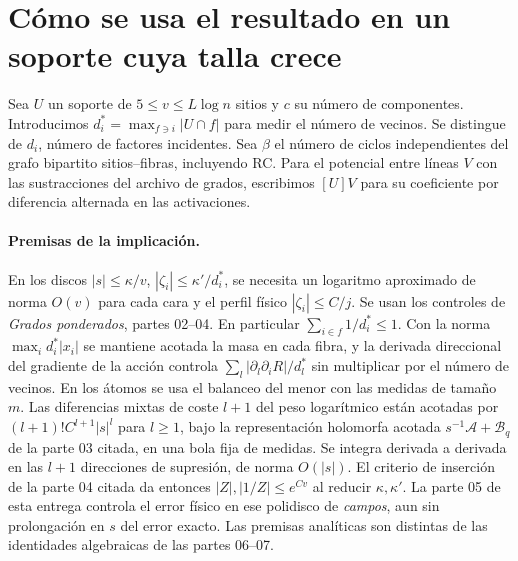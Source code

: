 \section{Cómo se usa el resultado en un soporte cuya talla crece}
Sea $U$ un soporte de $5\le v\le L\log n$ sitios y $c$ su número de componentes.
Introducimos $d_i^*=\max_{f\ni i}|U\cap f|$ para medir el número de vecinos.
Se distingue de $d_i$, número de factores incidentes. Sea $\beta$ el número de
ciclos independientes del grafo bipartito sitios--fibras, incluyendo RC.
Para el potencial entre líneas $V$ con las sustracciones del archivo de grados,
escribimos $[U]V$ para su coeficiente por diferencia alternada en las activaciones.
\paragraph{Premisas de la implicación.}
En los discos $|s|\le\kappa/v$, $|\zeta_i|\le\kappa'/d_i^*$, se necesita un logaritmo
aproximado de norma $O(v)$ para cada cara y el perfil físico $|\zeta_i|\le C/j$.
Se usan los controles de \emph{Grados ponderados}, partes 02--04. En particular
$\sum_{i\in f}1/d_i^*\le1$. Con la norma $\max_i d_i^*|x_i|$ se mantiene acotada
la masa en cada fibra, y la derivada direccional del gradiente de la acción controla
$\sum_l|\partial_l\partial_i R|/d_l^*$ sin multiplicar por el número de vecinos.
En los átomos se usa el balanceo del menor con las medidas de tamaño $m$.
Las diferencias mixtas de coste $l+1$ del peso logarítmico están acotadas por
$(l+1)! C^{l+1}|s|^l$ para $l\ge1$, bajo la representación holomorfa acotada
$s^{-1}\mathscr A+\mathscr B_q$ de la parte 03 citada, en una bola fija de medidas.
Se integra derivada a derivada en las $l+1$ direcciones de supresión, de norma $O(|s|)$.
El criterio de inserción de la parte 04 citada da entonces $|Z|,|1/Z|\le e^{Cv}$
al reducir $\kappa,\kappa'$. La parte 05 de esta entrega controla el error físico
en ese polidisco de \emph{campos}, aun sin prolongación en $s$ del error exacto.
Las premisas analíticas son distintas de las identidades algebraicas de las partes 06--07.
